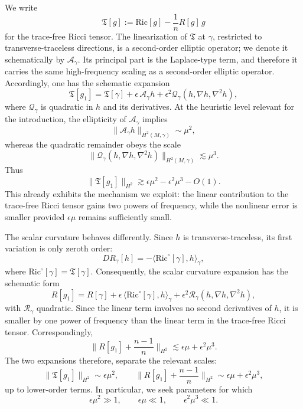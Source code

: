 \documentclass{amsart}
\begin{document}
\noindent We write
\[
\mathfrak{T}[g]:=\text{Ric}[g]-\frac1n R[g]\,g
\]
for the trace-free Ricci tensor. The linearization of $\mathfrak{T}$ at $\gamma$, restricted to transverse-traceless directions, is a second-order elliptic operator; we denote it schematically by $\mathcal{A}_{\gamma}$. Its principal part is the Laplace-type term, and therefore it carries the same high-frequency scaling as a second-order elliptic operator. Accordingly, one has the schematic expansion
\[
\mathfrak{T}[g_{1}]
=
\mathfrak{T}[\gamma]
+\epsilon\,\mathcal{A}_{\gamma}h
+\epsilon^{2}\mathcal{Q}_{\gamma}(h,\nabla h,\nabla^{2}h),
\]
where $\mathcal{Q}_{\gamma}$ is quadratic in $h$ and its derivatives. At the heuristic level relevant for the introduction, the ellipticity of $\mathcal{A}_{\gamma}$ implies
\[
\|\mathcal{A}_{\gamma}h\|_{H^{2}(M,\gamma)}\sim \mu^{2},
\]
whereas the quadratic remainder obeys the scale
\[
\|\mathcal{Q}_{\gamma}(h,\nabla h,\nabla^{2}h)\|_{H^{2}(M,\gamma)}\lesssim \mu^{3}.
\]
Thus
\[
\|\mathfrak{T}[g_{1}]\|_{H^{2}}
\gtrsim
\epsilon\mu^{2}
-
\epsilon^{2}\mu^{3}
-
O(1).
\]
This already exhibits the mechanism we exploit: the linear contribution to the trace-free Ricci tensor gains two powers of frequency, while the nonlinear error is smaller provided $\epsilon\mu$ remains sufficiently small.


\noindent The scalar curvature behaves differently. Since $h$ is transverse-traceless, its first variation is only zeroth order:
\[
D R_{\gamma}[h]
=
-\langle \text{Ric}^{\circ}[\gamma],h\rangle_{\gamma},
\]
where $\text{Ric}^{\circ}[\gamma]=\mathfrak{T}[\gamma]$. Consequently, the scalar curvature expansion has the schematic form
\[
R[g_{1}]
=
R[\gamma]
+
\epsilon\,\langle \text{Ric}^{\circ}[\gamma],h\rangle_{\gamma}
+
\epsilon^{2}\mathcal{R}_{\gamma}(h,\nabla h,\nabla^{2}h),
\]
with $\mathcal{R}_{\gamma}$ quadratic. Since the linear term involves no second derivatives of $h$, it is smaller by one power of frequency than the linear term in the trace-free Ricci tensor. Correspondingly,
\[
\Big\|R[g_{1}]+\frac{n-1}{n}\Big\|_{H^{2}}
\lesssim
\epsilon\mu+\epsilon^{2}\mu^{3}.
\]
The two expansions therefore, separate the relevant scales:
\[
\|\mathfrak{T}[g_{1}]\|_{H^{2}}
\sim
\epsilon\mu^{2},
\qquad
\Big\|R[g_{1}]+\frac{n-1}{n}\Big\|_{H^{2}}
\sim
\epsilon\mu+\epsilon^{2}\mu^{3},
\]
up to lower-order terms. In particular, we seek parameters for which
\[
\epsilon\mu^{2}\gg1,
\qquad
\epsilon\mu\ll1,
\qquad
\epsilon^{2}\mu^{3}\ll1.
\]
\end{document}
